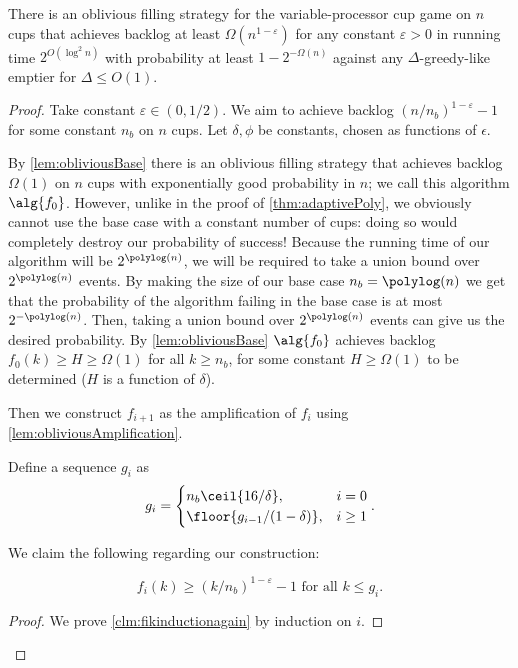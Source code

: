 \begin{theorem}
  \label{thm:obliviousPoly}
  There is an oblivious filling strategy for the
  variable-processor cup game on $n$ cups that achieves backlog
  at least $\Omega(n^{1-\varepsilon})$ for any constant $\varepsilon
  >0$ in running time $2^{O(\log^2 n)}$ with probability at least
  $1-2^{-\Omega(n)}$ against any $\Delta$-greedy-like emptier for
  $\Delta \le O(1)$.
\end{theorem}
\begin{proof}
  Take constant $\varepsilon \in (0, 1/2)$.
  We aim to achieve backlog $(n/n_b)^{1-\varepsilon}-1$ for some constant $n_b$ on $n$ cups.
  Let $\delta, \phi$ be constants, chosen as functions of $\epsilon$.

  By \cref{lem:obliviousBase} there is an oblivious filling
  strategy that achieves backlog $\Omega(1)$ on $n$ cups with
  exponentially good probability in $n$; we call this algorithm
  $\alg{f_0}$.
  However, unlike in the proof of \cref{thm:adaptivePoly}, we
  obviously cannot use the base case with a constant number of
  cups: doing so would completely destroy our probability of
  success! Because the running time of our algorithm will be
  $2^{\polylog(n)}$, we will be required to take a union bound
  over $2^{\polylog(n)}$ events. By making the size of our base
  case $n_b = \polylog(n)$ we get that the probability of the
  algorithm failing in the base case is at most
  $2^{-\polylog(n)}$. Then, taking a union bound over
  $2^{\polylog(n)}$ events can give us the desired probability.
  By \cref{lem:obliviousBase} $\alg{f_0}$ achieves backlog
  $f_0(k) \ge H \ge \Omega(1)$ for all $k \ge n_b$, for some
  constant $H \ge \Omega(1)$ to be determined ($H$ is a function
  of $\delta$).

  Then we construct $f_{i+1}$ as the amplification of $f_i$ using
  \cref{lem:obliviousAmplification}.

  Define a sequence $g_i$ as 
  $$g_i =
  \begin{cases}
    n_b\ceil{16/\delta}, & i=0\\
    \floor{ g_{i-1}/(1-\delta) }, & i\ge 1 
  \end{cases}.$$

  We claim the following regarding our construction:
  \begin{clm}
    \label{clm:fikinductionagain}
    \begin{equation}
      f_i(k) \ge (k/n_b)^{1-\varepsilon} - 1 \text{ for all } k \le g_i. \label{eqn:fikinductionAGAIN}
    \end{equation}
  \end{clm}
  \begin{proof}
  We prove \cref{clm:fikinductionagain} by induction on $i$. 


\end{proof}
\end{proof}
